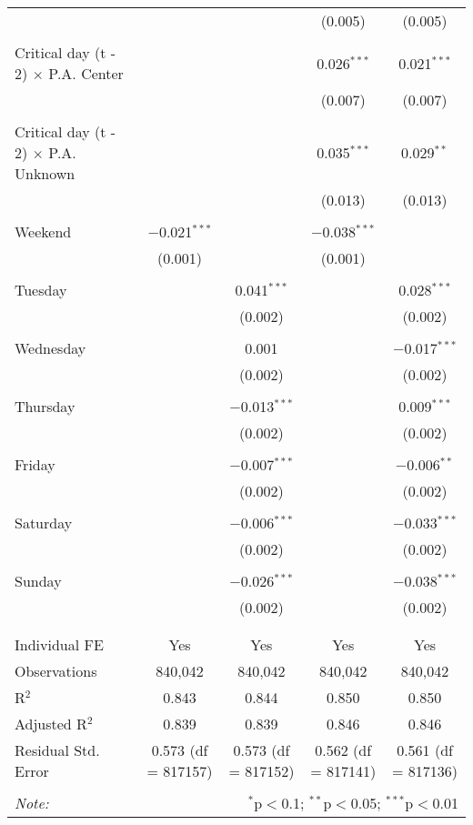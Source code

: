 \documentclass[
]{article}
\begin{document}
\begin{table}[!htbp]
{\begin{tabular}{@{\extracolsep{5pt}}lcccc}
  &  &  & (0.005) & (0.005) \\ 
  & & & & \\ 
 Critical day (t - 2) $\times$ P.A. Center &  &  & 0.026$^{***}$ & 0.021$^{***}$ \\ 
  &  &  & (0.007) & (0.007) \\ 
  & & & & \\ 
 Critical day (t - 2) $\times$ P.A. Unknown &  &  & 0.035$^{***}$ & 0.029$^{**}$ \\ 
  &  &  & (0.013) & (0.013) \\ 
  & & & & \\ 
 Weekend & $-$0.021$^{***}$ &  & $-$0.038$^{***}$ &  \\ 
  & (0.001) &  & (0.001) &  \\ 
  & & & & \\ 
 Tuesday &  & 0.041$^{***}$ &  & 0.028$^{***}$ \\ 
  &  & (0.002) &  & (0.002) \\ 
  & & & & \\ 
 Wednesday &  & 0.001 &  & $-$0.017$^{***}$ \\ 
  &  & (0.002) &  & (0.002) \\ 
  & & & & \\ 
 Thursday &  & $-$0.013$^{***}$ &  & 0.009$^{***}$ \\ 
  &  & (0.002) &  & (0.002) \\ 
  & & & & \\ 
 Friday &  & $-$0.007$^{***}$ &  & $-$0.006$^{**}$ \\ 
  &  & (0.002) &  & (0.002) \\ 
  & & & & \\ 
 Saturday &  & $-$0.006$^{***}$ &  & $-$0.033$^{***}$ \\ 
  &  & (0.002) &  & (0.002) \\ 
  & & & & \\ 
 Sunday &  & $-$0.026$^{***}$ &  & $-$0.038$^{***}$ \\ 
  &  & (0.002) &  & (0.002) \\ 
  & & & & \\ 
\hline \\[-1.8ex] 
Individual FE & Yes & Yes & Yes & Yes \\ 
Observations & 840,042 & 840,042 & 840,042 & 840,042 \\ 
R$^{2}$ & 0.843 & 0.844 & 0.850 & 0.850 \\ 
Adjusted R$^{2}$ & 0.839 & 0.839 & 0.846 & 0.846 \\ 
Residual Std. Error & 0.573 (df = 817157) & 0.573 (df = 817152) & 0.562 (df = 817141) & 0.561 (df = 817136) \\ 
\hline 
\hline \\[-1.8ex] 
\textit{Note:}  & \multicolumn{4}{r}{$^{*}$p$<$0.1; $^{**}$p$<$0.05; $^{***}$p$<$0.01} \\ 
\end{tabular}
} 
\end{table} 
\newpage
\end{document}
